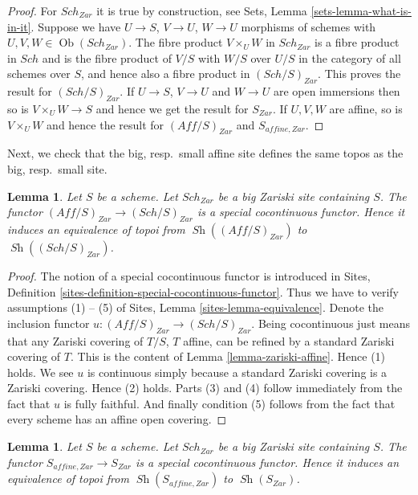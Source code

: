 \documentclass{stacks-project}
\theoremstyle{plain}
\newtheorem{lemma}[subsection]{Lemma}
\theoremstyle{definition}
\theoremstyle{remark}
\numberwithin{equation}{subsection}
\def\Sch{\mathit{Sch}}
\def\Ob{\mathop{\mathrm{Ob}}\nolimits}
\def\Sh{\mathop{\mathit{Sh}}\nolimits}
\begin{document}
\begin{proof}
For $\Sch_{Zar}$ it is true by construction, see
Sets, Lemma \ref{sets-lemma-what-is-in-it}.
Suppose we have $U \to S$, $V \to U$, $W \to U$ morphisms
of schemes with $U, V, W \in \Ob(\Sch_{Zar})$.
The fibre product $V \times_U W$ in $\Sch_{Zar}$
is a fibre product in $\Sch$ and
is the fibre product of $V/S$ with $W/S$ over $U/S$ in
the category of all schemes over $S$, and hence also a
fibre product in $(\Sch/S)_{Zar}$.
This proves the result for $(\Sch/S)_{Zar}$.
If $U \to S$, $V \to U$ and $W \to U$ are open immersions then so is
$V \times_U W \to S$ and hence we get the result for $S_{Zar}$.
If $U, V, W$ are affine, so is $V \times_U W$ and hence the
result for $(\textit{Aff}/S)_{Zar}$ and $S_{affine, Zar}$.
\end{proof}

\noindent
Next, we check that the big, resp.\ small affine site defines the same
topos as the big, resp.\ small site.

\begin{lemma}
\label{lemma-affine-big-site-Zariski}
Let $S$ be a scheme. Let $\Sch_{Zar}$ be a big Zariski
site containing $S$.
The functor $(\textit{Aff}/S)_{Zar} \to (\Sch/S)_{Zar}$
is a special cocontinuous functor. Hence it induces an equivalence
of topoi from $\Sh((\textit{Aff}/S)_{Zar})$ to
$\Sh((\Sch/S)_{Zar})$.
\end{lemma}

\begin{proof}
The notion of a special cocontinuous functor is introduced in
Sites, Definition \ref{sites-definition-special-cocontinuous-functor}.
Thus we have to verify assumptions (1) -- (5) of
Sites, Lemma \ref{sites-lemma-equivalence}.
Denote the inclusion functor
$u : (\textit{Aff}/S)_{Zar} \to (\Sch/S)_{Zar}$.
Being cocontinuous just means that any Zariski covering of
$T/S$, $T$ affine, can be refined by a standard Zariski covering of $T$.
This is the content of
Lemma \ref{lemma-zariski-affine}.
Hence (1) holds. We see $u$ is continuous simply because a standard
Zariski covering is a Zariski covering. Hence (2) holds.
Parts (3) and (4) follow immediately from the fact that $u$ is
fully faithful. And finally condition (5) follows from the
fact that every scheme has an affine open covering.
\end{proof}

\begin{lemma}
\label{lemma-alternative-zariski}
Let $S$ be a scheme.  Let $\Sch_{Zar}$ be a big Zariski
site containing $S$. The functor $S_{affine, Zar} \to S_{Zar}$
is a special cocontinuous functor. Hence it induces an equivalence
of topoi from $\Sh(S_{affine, Zar})$ to $\Sh(S_{Zar})$.
\end{lemma}
\end{document}
